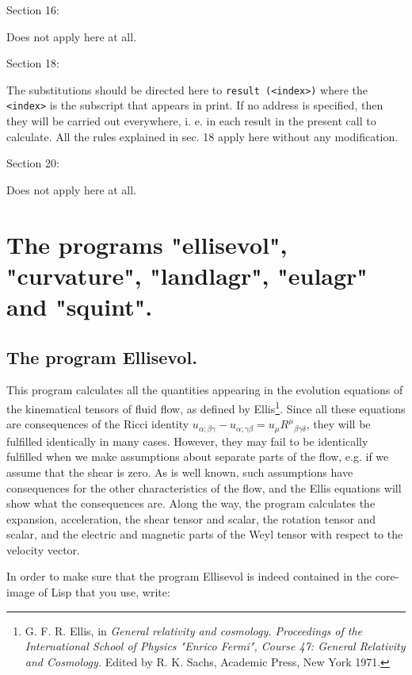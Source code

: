 Section 16:

Does not apply here at all.

\medskip

Section 18:

The substitutions should be  directed  here  to  \verb+result (<index>)+ where
the \verb+<index>+ is the subscript that appears in print. If no address is
specified, then they  will  be carried out everywhere, i. e. in each result in
the present call
     to calculate. All the rules explained in sec. 18 apply  here
     without any modification.

\medskip

Section 20:

Does not apply here at all.

\section{The programs "ellisevol", "curvature", "landlagr", "eulagr" and
"squint".}

\subsection{The program Ellisevol.}

This program calculates all the quantities appearing in the evolution equations
of the kinematical tensors of fluid flow, as defined by Ellis\footnote{G. F. R.
Ellis, in {\it General relativity and cosmology. Proceedings of the
International School of Physics "Enrico Fermi", Course 47: General Relativity
and Cosmology.} Edited by R. K. Sachs, Academic Press, New York 1971.}. Since
all these equations are consequences of the Ricci identity $u_{\alpha;\beta
\gamma} - u_{\alpha; \gamma \beta} = u_{\mu}{R^{\mu}}_{\beta \gamma \delta}$,
they will be fulfilled identically in many cases. However, they may fail to be
identically fulfilled when we make assumptions about separate parts of the
flow, e.g. if we assume that the shear is zero. As is well known, such
assumptions have consequences for the other characteristics of the flow, and
the Ellis equations will show what the consequences are. Along the way, the
program calculates the expansion, acceleration, the shear tensor and scalar,
the rotation tensor and scalar, and the electric and magnetic parts of the Weyl
tensor with respect to the velocity vector.

In order to make sure that the program Ellisevol is indeed contained in the
core-image of Lisp that you use, write:

